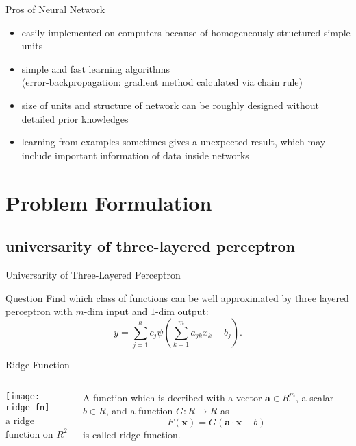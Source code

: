 \documentclass[fleqn,aspectratio=1610]{beamer}
\begin{document}
\begin{frame}[label={sec:org0b8b817}]{Pros of Neural Network}
\begin{itemize}
\item easily implemented on computers because of
homogeneously structured simple units
\item simple and fast learning algorithms\\[0pt]
(error-backpropagation: gradient method calculated via chain rule)
\item size of units and structure of network can be roughly
designed without detailed prior knowledges
\item learning from examples sometimes gives
a unexpected result, which may include
important information of data inside networks
\end{itemize}
\end{frame}

\section{Problem Formulation}
\label{sec:org31f5295}
\subsection{universarity of three-layered perceptron}
\label{sec:orgdd8d47a}
\begin{frame}[label={sec:org1ddb07d}]{Universarity of Three-Layered Perceptron}
\begin{alertblock}{Question}
Find which class of functions can be well approximated by
three layered perceptron with \(m\)-dim input and \(1\)-dim output:
\begin{equation}
  y=\sum_{j=1}^hc_{j}\psi\left(\sum_{k=1}^{m}a_{jk}x_k-b_j\right).
\end{equation}
\end{alertblock}
\end{frame}

\begin{frame}[label={sec:org1b83181}]{Ridge Function}
\begin{columns}
\begin{column}{0.5\columnwidth}
\begin{center}
\texttt{[image: ridge\_fn]}\\[0pt]
a ridge function on \(R^{2}\)
\end{center}
\end{column}

\begin{column}{0.5\columnwidth}
\begin{definition}\label{sec:orgd69b418}
A function which is decribed with
a vector \(\boldsymbol{a}\in R^{m}\), a scalar \(b\in R\),
and a function \(G:R\to R\) as
\begin{equation}
  F(\boldsymbol{x})=G(\boldsymbol{a}\cdot\boldsymbol{x}-b)
\end{equation}
is called \alert{ridge function}.
\end{definition}
\end{column}
\end{columns}
\end{frame}
\end{document}
